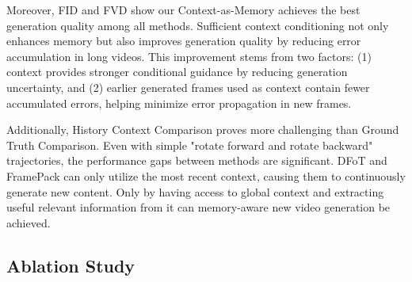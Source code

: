 Moreover, FID and FVD show our Context-as-Memory achieves the best generation quality among all methods. Sufficient context conditioning not only enhances memory but also improves generation quality by reducing error accumulation in long videos. This improvement stems from two factors: (1) context provides stronger conditional guidance by reducing generation uncertainty, and (2) earlier generated frames used as context contain fewer accumulated errors, helping minimize error propagation in new frames.

Additionally, History Context Comparison proves more challenging than Ground Truth Comparison. Even with simple "rotate forward and rotate backward" trajectories, the performance gaps between methods are significant. DFoT and FramePack can only utilize the most recent context, causing them to continuously generate new content. Only by having access to global context and extracting useful relevant information from it can memory-aware new video generation be achieved.

\subsection{Ablation Study}

